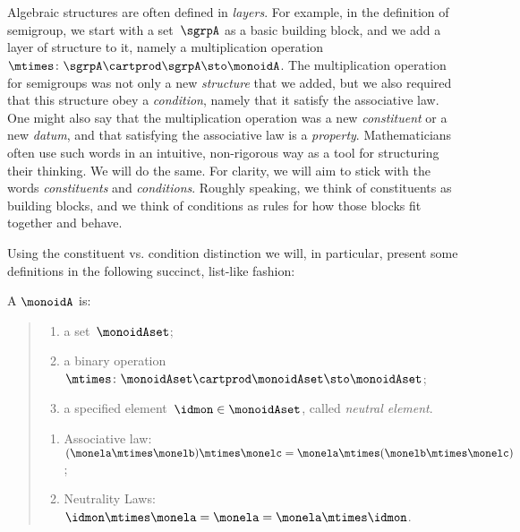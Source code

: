 

\section{}
\label{sec:parallelism-monoids}


Algebraic structures are often defined in \emph{layers}.
For example, in the definition of semigroup, we start with a set~$\sgrpA$ as a basic building block, and we add a layer of structure to it, namely a multiplication operation~$\mtimes \colon \sgrpA \cartprod \sgrpA \sto \monoidA$.
The multiplication operation for semigroups was not only a new \emph{structure} that we added, but we also required that this structure obey a \emph{condition}, namely that it satisfy the associative law.
One might also say that the multiplication operation was a new \emph{constituent} or a new \emph{datum}, and that satisfying the associative law is a \emph{property}.
Mathematicians often use such words in an intuitive, non-rigorous way as a tool for structuring their thinking.
We will do the same.
For clarity, we will aim to stick with the words \emph{constituents} and \emph{conditions}.
Roughly speaking, we think of constituents as building blocks, and we think of conditions as rules for how those blocks fit together and behave.

Using the constituent vs. condition distinction we will, in particular, present some definitions in the following succinct, list-like fashion:

\begin{ctdefinition}[Monoid]
  \label{def:monoid}
  A \emph{}  $\monoidA$  is:
  \begin{quote}
    \constit
    \begin{enumerate}
      \item a set~$\monoidAset$;
      \item a binary operation~$\mtimes  \colon \monoidAset \cartprod \monoidAset \sto \monoidAset$;
      \item a specified element~$\idmon \in \monoidAset$, called \emph{neutral element}.
    \end{enumerate}
    \condit
    \begin{enumerate}
      \item Associative law:~$(\monela\mtimes  \monelb)\mtimes  \monelc=
      \monela\mtimes  (\monelb\mtimes  \monelc)$;
      \item Neutrality Laws:~$\idmon\mtimes \monela=\monela=\monela\mtimes  \idmon$.
    \end{enumerate}
  \end{quote}
\end{ctdefinition}


